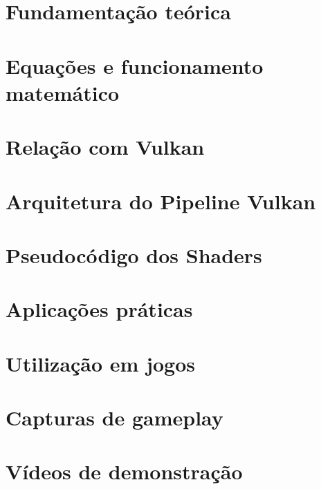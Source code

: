 \documentclass[12pt,a4paper]{report}
\begin{document}
\chapter{Fundamentação teórica}




\chapter{Equações e funcionamento matemático}




\chapter{Relação com Vulkan}




\chapter{Arquitetura do Pipeline Vulkan}



\chapter{Pseudocódigo dos Shaders}



\chapter{Aplicações práticas}




\chapter{Utilização em jogos}



\chapter{Capturas de gameplay}




\chapter{Vídeos de demonstração}
\end{document}
